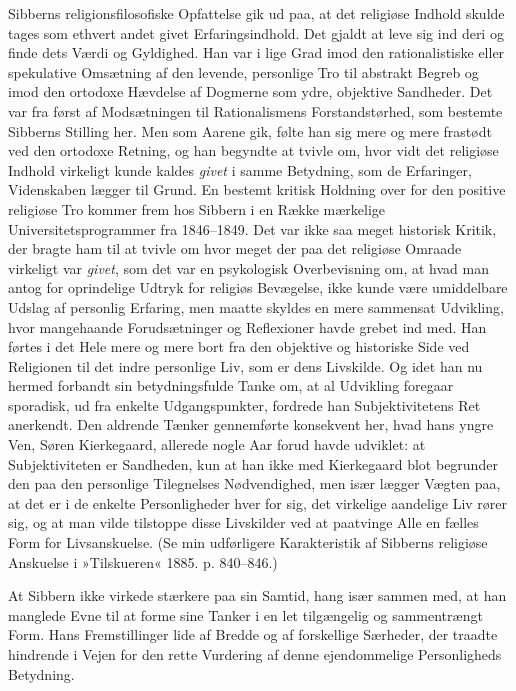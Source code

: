 \documentclass[12pt,a4paper,openany]{book}
\newcommand{\opage}[1]{\marginnote{\footnotesize\textit{[#1]}}}
\begin{document}
Sibberns religionsfilosofiske Opfattelse gik ud paa,
at det religiøse Indhold skulde tages som ethvert andet
givet Erfaringsindhold. Det gjaldt at leve sig ind
deri og finde dets Værdi og Gyldighed. Han var i lige
Grad imod den rationalistiske eller spekulative Omsætning
af den levende, personlige Tro til abstrakt Begreb
og imod den ortodoxe Hævdelse af Dogmerne som ydre,
objektive Sandheder. Det var fra først af Modsætningen
til Rationalismens Forstandstørhed, som bestemte Sibberns
Stilling her. Men som Aarene gik, følte han sig mere
\opage{23}og mere frastødt ved den ortodoxe Retning, og han begyndte
at tvivle om, hvor vidt det religiøse Indhold
virkeligt kunde kaldes \textit{givet} i samme Betydning, som de
Erfaringer, Videnskaben lægger til Grund. En bestemt
kritisk Holdning over for den positive religiøse Tro kommer
frem hos Sibbern i en Række mærkelige Universitetsprogrammer
fra 1846--1849. Det var ikke saa meget
historisk Kritik, der bragte ham til at tvivle om hvor
meget der paa det religiøse Omraade virkeligt var \textit{givet},
som det var en psykologisk Overbevisning om, at hvad
man antog for oprindelige Udtryk for religiøs Bevægelse,
ikke kunde være umiddelbare Udslag af personlig Erfaring,
men maatte skyldes en mere sammensat Udvikling,
hvor mangehaande Forudsætninger og Reflexioner havde
grebet ind med. Han førtes i det Hele mere og
mere bort fra den objektive og historiske Side ved Religionen
til det indre personlige Liv, som er dens Livskilde.
Og idet han nu hermed forbandt sin betydningsfulde
Tanke om, at al Udvikling foregaar sporadisk, ud
fra enkelte Udgangspunkter, fordrede han Subjektivitetens
Ret anerkendt. Den aldrende Tænker gennemførte konsekvent
her, hvad hans yngre Ven, Søren Kierkegaard,
allerede nogle Aar forud havde udviklet: at Subjektiviteten
er Sandheden, kun at han ikke med Kierkegaard
blot begrunder den paa den personlige Tilegnelses Nødvendighed,
men især lægger Vægten paa, at det er i de
enkelte Personligheder hver for sig, det virkelige aandelige
Liv rører sig, og at man vilde tilstoppe disse Livskilder
ved at paatvinge Alle en fælles Form for Livsanskuelse.
(Se min udførligere Karakteristik af Sibberns
religiøse Anskuelse i »Tilskueren« 1885. p. 840--846.)

At Sibbern ikke virkede stærkere paa sin Samtid,
hang især sammen med, at han manglede Evne til at
\opage{24}forme sine Tanker i en let tilgængelig og sammentrængt
Form. Hans Fremstillinger lide af Bredde og af forskellige
Særheder, der traadte hindrende i Vejen for den
rette Vurdering af denne ejendommelige Personligheds
Betydning.
\end{document}
